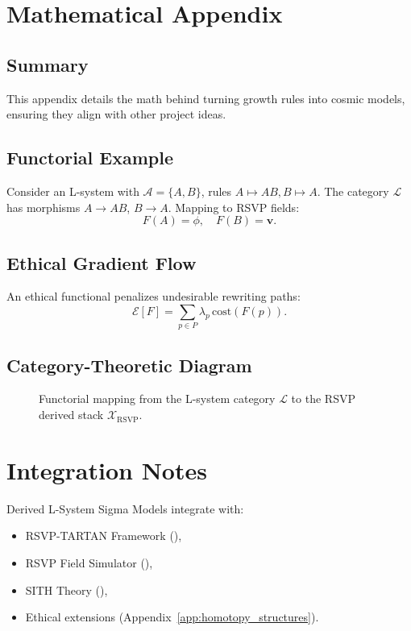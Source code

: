 \documentclass[11pt,oneside]{memoir}
\theoremstyle{plain}
\newcommand{\X}{\mathcal{X}}
\newcommand{\A}{\mathcal{A}}
\newcommand{\L}{\mathcal{L}}
\begin{document}
\section{Mathematical Appendix}
\subsection{Summary}
This appendix details the math behind turning growth rules into cosmic models, ensuring they align with other project ideas.

\subsection{Functorial Example}
Consider an L-system with \(\A = \{A,B\}\), rules \(A \mapsto AB, B \mapsto A\). The category \(\L\) has morphisms \(A \to AB\), \(B \to A\). Mapping to RSVP fields:
\begin{equation}
    F(A) = \phi, \quad F(B) = \mathbf{v}.
\end{equation}

\subsection{Ethical Gradient Flow}
An ethical functional penalizes undesirable rewriting paths:
\begin{equation}
    \mathcal{E}[F] = \sum_{p \in P} \lambda_p \, \mathrm{cost}(F(p)).
\end{equation}

\subsection{Category-Theoretic Diagram}
\begin{figure}[h]
    \centering
    \caption{Functorial mapping from the L-system category \(\L\) to the RSVP derived stack \(\X_{\mathrm{RSVP}}\).}
    \label{fig:l_system_functor}
\end{figure}

\section{Integration Notes}
Derived L-System Sigma Models integrate with:
\begin{itemize}
    \item RSVP-TARTAN Framework (),
    \item RSVP Field Simulator (),
    \item SITH Theory (),
    \item Ethical extensions (Appendix~\ref{app:homotopy_structures}).
\end{itemize}
\end{document}
